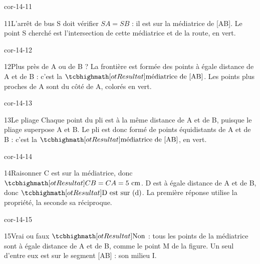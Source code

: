 \begin{blocLivre}{cor-14-11}\begin{corrige}{11}{L’arrêt de bus}
S doit vérifier $SA=SB$ : il est sur la médiatrice de [AB]. Le point S cherché est l’intersection de cette médiatrice et de la route, en vert.
\label{fig-cor-14-11}
\end{corrige}\end{blocLivre}
\begin{blocLivre}{cor-14-12}\begin{corrige}{12}{Plus près de A ou de B ?}
La frontière est formée des points à égale distance de A et de B : c’est la $\res{\text{médiatrice de [AB]}}$. Les points plus proches de A sont du côté de A, colorés en vert.
\label{fig-cor-14-12}
\end{corrige}\end{blocLivre}
\begin{blocLivre}{cor-14-13}\begin{corrige}{13}{Le pliage}
Chaque point du pli est à la même distance de A et de B, puisque le pliage superpose A et B. Le pli est donc formé de points équidistants de A et de B : c’est la $\res{\text{médiatrice de [AB]}}$, en vert.
\label{fig-cor-14-13}
\end{corrige}\end{blocLivre}
\begin{blocLivre}{cor-14-14}\begin{corrige}{14}{Raisonner}
C est sur la médiatrice, donc $\res{CB=CA=5\ \mathrm{cm}}$. D est à égale distance de A et de B, donc $\res{\text{D est sur (d)}}$. La première réponse utilise la propriété, la seconde sa réciproque.
\label{fig-cor-14-14}
\end{corrige}\end{blocLivre}
\begin{blocLivre}{cor-14-15}\begin{corrige}{15}{Vrai ou faux}
$\res{\text{Non}}$ : tous les points de la médiatrice sont à égale distance de A et de B, comme le point M de la figure. Un seul d’entre eux est sur le segment [AB] : son milieu I.
\label{fig-cor-14-15}
\end{corrige}\end{blocLivre}
